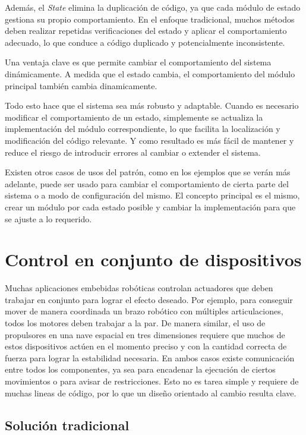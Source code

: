 Además, el \textit{State} elimina la duplicación de código, ya que cada módulo de estado gestiona su propio comportamiento. En el enfoque tradicional, muchos métodos deben realizar repetidas verificaciones del estado y aplicar el comportamiento adecuado, lo que conduce a código duplicado y potencialmente inconsistente.

Una ventaja clave es que permite cambiar el comportamiento del sistema dinámicamente. A medida que el estado cambia, el comportamiento del módulo principal también cambia dinamicamente. 

Todo esto hace que el sistema sea más robusto y adaptable. Cuando es necesario modificar el comportamiento de un estado, simplemente se actualiza la implementación del módulo correspondiente, lo que facilita la localización y modificación del código relevante. Y como resultado es más fácil de mantener y reduce el riesgo de introducir errores al cambiar o extender el sistema.

Existen otros casos de usos del patrón, como en los ejemplos que se verán más adelante, puede ser usado para cambiar el comportamiento de cierta parte del sistema o a modo de configuración del mismo. El concepto principal es el mismo, crear un módulo por cada estado posible y cambiar la implementación para que se ajuste a lo requerido.



\section{Control en conjunto de dispositivos}
Muchas aplicaciones embebidas robóticas controlan \gls{actuadores} que deben trabajar en conjunto para lograr el efecto deseado. Por ejemplo, para conseguir mover de manera coordinada un brazo robótico con múltiples articulaciones, todos los motores deben trabajar a la par. De manera similar, el uso de propulsores en una nave espacial en tres dimensiones requiere que muchos de estos dispositivos actúen en el momento preciso y con la cantidad correcta de fuerza para lograr la estabilidad necesaria. En ambos casos existe comunicación entre todos los componentes, ya sea para encadenar la ejecución de ciertos movimientos o para avisar de restricciones. Esto no es tarea simple y requiere de muchas lineas de código, por lo que un diseño orientado al cambio resulta clave.

\subsection*{Solución tradicional}

